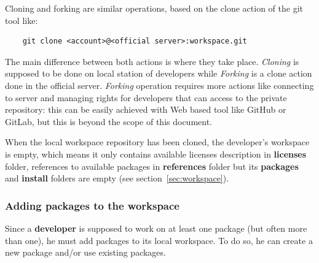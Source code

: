 \documentclass[12pt,a4paper]{article}
\begin{document}
Cloning and forking are similar operations, based on the clone action of the git tool like:
\begin{verbatim}
	git clone <account>@<official server>:workspace.git
\end{verbatim}
The main difference between both actions is where they take place. \textit{Cloning} is supposed to be done on local station of developers while \textit{Forking} is a clone action done in the official server. \textit{Forking} operation requires more actions like connecting to server and managing rights for developers that can access to the private repository: this can be easily achieved with Web based tool like GitHub or GitLab, but this is beyond the scope of this document.

When the local workspace repository has been cloned, the developer's workspace is empty, which means it only contains available licenses description in \textbf{licenses} folder, references to available packages in \textbf{references} folder but its \textbf{packages} and \textbf{install} folders are empty (see section~\ref{sec:workspace}).

\subsubsection{Adding packages to the workspace}

Since a \textbf{developer} is supposed to work on at least one package (but often more than one), he must add packages to its local workspace. To do so, he can create a new package and/or use existing packages.
\end{document}
